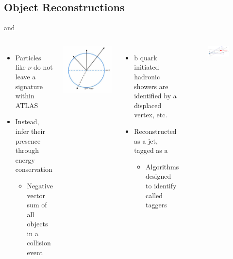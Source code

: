 \documentclass[aspectratio=169,xcolor=table]{beamer}
\begin{document}
  \subsection{Object Reconstructions}

    \begin{frame}[t]{\Etm and \bjets}
     \begin{columns}[t]
        \begin{itemize}
          \item Particles like $\nu$ do not leave a signature within ATLAS
          \item Instead, infer their presence through energy conservation
          \begin{itemize}
            \item Negative vector sum of all objects in a collision event
          \end{itemize}
        \end{itemize}
        \centering
        \includegraphics[width=.5\textwidth,keepaspectratio=true]{MET_Diagram.png}

      \begin{itemize}
        \item b quark initiated hadronic showers are identified by a displaced vertex, etc.
        \item Reconstructed as a jet, tagged as a \bjet
        \begin{itemize}
          \item Algorithms designed to identify \bjets called taggers \cite{b-tagging}
        \end{itemize}
      \end{itemize}
      \begin{figure}[!ht]
      \centering
      \includegraphics[width=.7\textwidth,keepaspectratio=true]{chapters/chapter5_eventreconnstruction/images/b-jet-schetch.png}
      \caption{\tiny \cite{bjet-trigger}}
      \end{figure}
      \end{columns}
    \end{frame}
\end{document}
